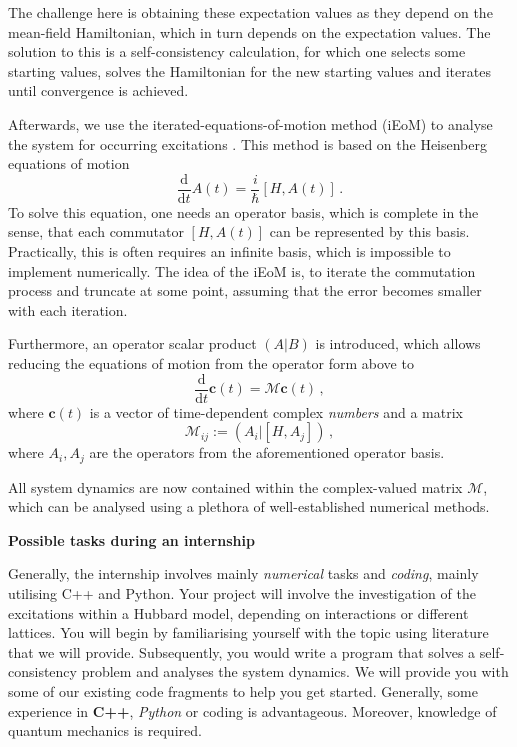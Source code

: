 \documentclass[20pt]{article}
\newcommand{\msection}[1]{ { \vspace{5mm} \hspace{-6mm} \large \textbf{#1}} \vspace{2mm} } %
\newcommand{\timeDeriv}{\frac{\mathrm{d}}{\mathrm{d}t}}
\begin{document}
The challenge here is obtaining these expectation values as they depend on the mean-field Hamiltonian, which in turn depends on the expectation values.
The solution to this is a self-consistency calculation, for which one selects some starting values,
solves the Hamiltonian for the new starting values and iterates until convergence is achieved.

Afterwards, we use the iterated-equations-of-motion method (iEoM) to analyse the system for occurring excitations \cite{philip18, Kalthoff2017}.
This method is based on the Heisenberg equations of motion 
\begin{equation}
    \timeDeriv A(t) = \frac{i}{\hbar} [H, A(t)]\,.
\end{equation}
To solve this equation, one needs an operator basis, which is complete in the sense, that each commutator $[H, A(t)]$ can be represented by this basis.
Practically, this is often requires an infinite basis, which is impossible to implement numerically.
The idea of the iEoM is, to iterate the commutation process and truncate at some point, assuming that the error becomes smaller with each iteration.

Furthermore, an operator scalar product $(A|B)$ is introduced, which allows reducing the equations of motion from the operator form above to
\begin{equation}
    \timeDeriv \mathbf{c}(t) = \mathcal{M} \mathbf{c}(t)\,,
\end{equation}
where $\mathbf{c}(t)$ is a vector of time-dependent complex \emph{numbers} and a matrix
\begin{equation}
    \mathcal{M}_{ij} := (A_i | [H, A_j])\,,
\end{equation}
where $A_i, A_j$ are the operators from the aforementioned operator basis.

All system dynamics are now contained within the complex-valued matrix $\mathcal{M}$, which can be analysed using a plethora of well-established numerical methods.


\msection{Possible tasks during an internship}

Generally, the internship involves mainly \emph{numerical} tasks and \emph{coding}, mainly utilising C++ and Python.
Your project will involve the investigation of the excitations within a Hubbard model, depending on interactions or different lattices.
You will begin by familiarising yourself with the topic using literature that we will provide.
Subsequently, you would write a program that solves a self-consistency problem and analyses the system dynamics.
We will provide you with some of our existing code fragments to help you get started.
Generally, some experience in \textbf{C++}, \emph{Python} or coding is advantageous. Moreover, knowledge of quantum mechanics is required.
\end{document}

